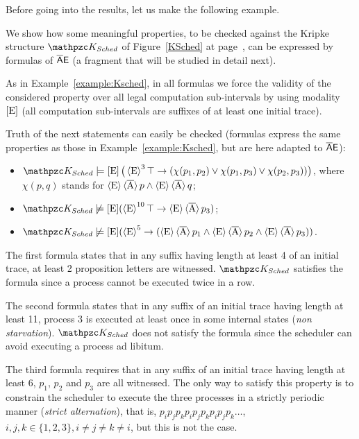 
Before going into the results, let us make the following example.

\begin{example}
We show how some meaningful properties, to be checked against
the Kripke structure
$\Ku_{Sched}$ of Figure~\ref{KSched} at page~\pageref{KSched},
can be expressed  by formulas of $\mathsf{\overline{A}E}$ (a fragment that will be studied in detail next).

As in Example~\ref{example:Ksched}, in all formulas we force the validity of the considered property over all legal computation sub-intervals by using modality $\operatorname{\mathopen[ E \mathclose]}$ (all computation sub-intervals are suffixes of at least one initial trace).

Truth of the next statements can easily be checked (formulas express the same properties as those in Example~\ref{example:Ksched}, but are here adapted to $\mathsf{\overline{A}E}$):
\begin{itemize}
    \item $\Ku_{Sched}\models\hsEu\big(\hsE^3\top \rightarrow (\chi(p_1,p_2) \vee \chi(p_1,p_3) \vee \chi(p_2,p_3))\big)$, \newline where $\chi(p,q)$ stands for $\operatorname{\langle E\rangle}\operatorname{\langle \overline{A}\rangle} p \wedge \operatorname{\langle E\rangle}\operatorname{\langle \overline{A}\rangle} q$;
    \item $\Ku_{Sched}\not\models\hsEu(\hsE^{10}\top \rightarrow \hsE\hsAt p_3)$;
    \item $\Ku_{Sched}\not\models\hsEu(\hsE^5 \rightarrow (\hsE\hsAt p_1 \wedge \hsE\hsAt p_2 \wedge \hsE\hsAt p_3))$.
\end{itemize}
The first formula states that in any suffix having length at least 4 of an initial trace, at least 2 proposition letters are witnessed. $\Ku_{Sched}$ satisfies the formula since a process cannot be executed twice in a row. 

The second formula states that in any suffix of an initial trace having length at least 11, process 3 is executed at least once in some internal states (\emph{non starvation}). $\Ku_{Sched}$ does not satisfy the formula since the scheduler can avoid executing a process ad libitum. 

The third formula requires that in any suffix of an initial trace having length at least 6, $p_1$, $p_2$ and $p_3$ are all witnessed.
The only way to satisfy this property is to constrain the scheduler to execute the three processes in a strictly periodic manner (\emph{strict alternation}), that is, $p_i p_j p_k p_i p_j p_k p_i p_j p_k\ldots$, $i,j,k \in \{1,2,3\}, i \neq j \neq k \neq i$, but this is not the case.
\end{example}
